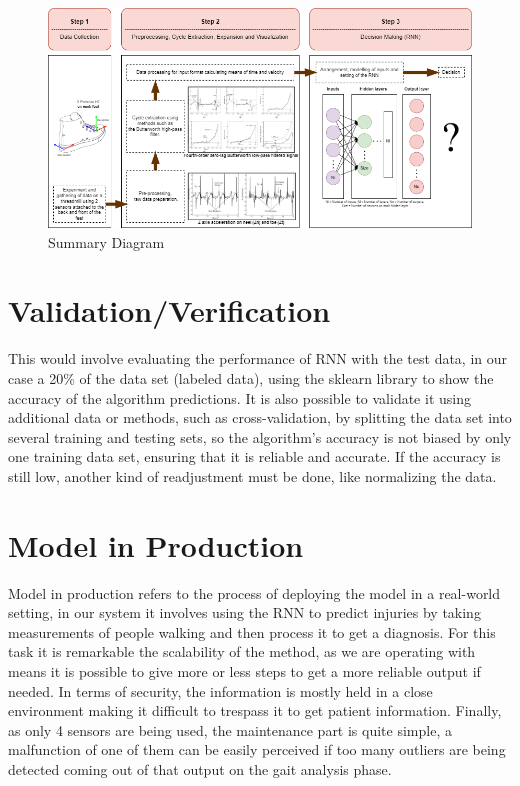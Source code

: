 \begin{figure}[h]
    \centering
    \includegraphics[scale=0.45]{Images/Summary-diagram.png}
    \caption{Summary Diagram}
    \label{fig:Model}
\end{figure}

\section{Validation/Verification}
This would involve evaluating the performance of RNN with the test data, in our case a 20\% of the data set (labeled data), using the sklearn library to show the accuracy of the algorithm predictions. It is also possible to validate it using additional data or methods, such as cross-validation, by splitting the data set into several training and testing sets, so the algorithm's accuracy is not biased by only one training data set, ensuring that it is reliable and accurate. If the accuracy is still low, another kind of readjustment must be done, like normalizing the data.


\section{Model in Production}
Model in production refers to the process of deploying the model in a real-world setting, in our system it involves using the RNN to predict injuries by taking measurements of people walking and then process it to get a diagnosis. For this task it is remarkable the scalability of the method, as we are operating with means it is possible to give more or less steps to get a more reliable output if needed. In terms of security, the information is mostly held in a close environment making it difficult to trespass it to get patient information. Finally, as only 4 sensors are being used, the maintenance part is quite simple, a malfunction of one of them can be easily perceived if too many outliers are being detected coming out of that output on the gait analysis phase. 